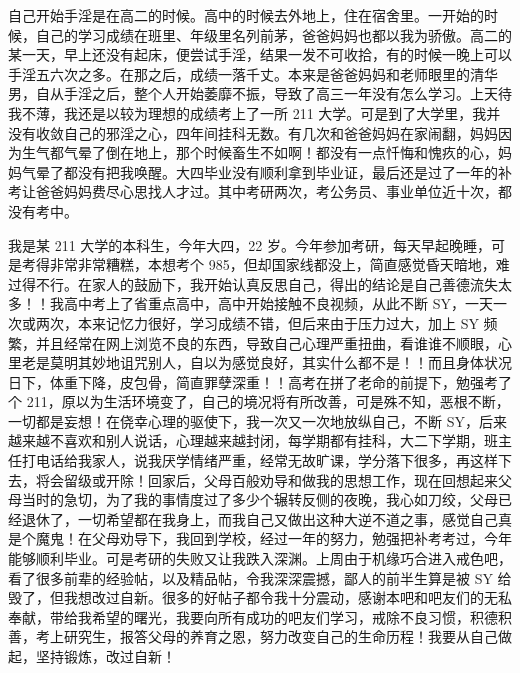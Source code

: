 \begin{case}
    自己开始手淫是在高二的时候。高中的时候去外地上，住在宿舍里。一开始的时候，自己的学习成绩在班里、年级里名列前茅，爸爸妈妈也都以我为骄傲。高二的某一天，早上还没有起床，便尝试手淫，结果一发不可收拾，有的时候一晚上可以手淫五六次之多。在那之后，成绩一落千丈。本来是爸爸妈妈和老师眼里的清华男，自从手淫之后，整个人开始萎靡不振，导致了高三一年没有怎么学习。上天待我不薄，我还是以较为理想的成绩考上了一所 211 大学。可是到了大学里，我并没有收敛自己的邪淫之心，四年间挂科无数。有几次和爸爸妈妈在家闹翻，妈妈因为生气都气晕了倒在地上，那个时候畜生不如啊！都没有一点忏悔和愧疚的心，妈妈气晕了都没有把我唤醒。大四毕业没有顺利拿到毕业证，最后还是过了一年的补考让爸爸妈妈费尽心思找人才过。其中考研两次，考公务员、事业单位近十次，都没有考中。
\end{case}

\begin{case}
    我是某 211 大学的本科生，今年大四，22 岁。今年参加考研，每天早起晚睡，可是考得非常非常糟糕，本想考个 985，但却国家线都没上，简直感觉昏天暗地，难过得不行。在家人的鼓励下，我开始认真反思自己，得出的结论是自己善德流失太多！！我高中考上了省重点高中，高中开始接触不良视频，从此不断 SY，一天一次或两次，本来记忆力很好，学习成绩不错，但后来由于压力过大，加上 SY 频繁，并且经常在网上浏览不良的东西，导致自己心理严重扭曲，看谁谁不顺眼，心里老是莫明其妙地诅咒别人，自以为感觉良好，其实什么都不是！！而且身体状况日下，体重下降，皮包骨，简直罪孽深重！！高考在拼了老命的前提下，勉强考了个 211，原以为生活环境变了，自己的境况将有所改善，可是殊不知，恶根不断，一切都是妄想！在侥幸心理的驱使下，我一次又一次地放纵自己，不断 SY，后来越来越不喜欢和别人说话，心理越来越封闭，每学期都有挂科，大二下学期，班主任打电话给我家人，说我厌学情绪严重，经常无故旷课，学分落下很多，再这样下去，将会留级或开除！回家后，父母百般劝导和做我的思想工作，现在回想起来父母当时的急切，为了我的事情度过了多少个辗转反侧的夜晚，我心如刀绞，父母已经退休了，一切希望都在我身上，而我自己又做出这种大逆不道之事，感觉自己真是个魔鬼！在父母劝导下，我回到学校，经过一年的努力，勉强把补考考过，今年能够顺利毕业。可是考研的失败又让我跌入深渊。上周由于机缘巧合进入戒色吧，看了很多前辈的经验帖，以及精品帖，令我深深震撼，鄙人的前半生算是被 SY 给毁了，但我想改过自新。很多的好帖子都令我十分震动，感谢本吧和吧友们的无私奉献，带给我希望的曙光，我要向所有成功的吧友们学习，戒除不良习惯，积德积善，考上研究生，报答父母的养育之恩，努力改变自己的生命历程！我要从自己做起，坚持锻炼，改过自新！
\end{case}

